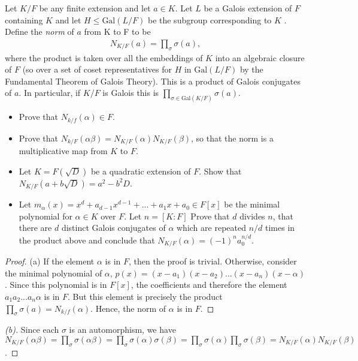 \documentclass[10pt]{article}
\newcommand{\Gal}{\text{Gal}}
\newenvironment{problem}[2][Problem]{\begin{trivlist}
		\item[\hskip \labelsep {\bfseries #1}\hskip \labelsep {\bfseries #2.}]}{\end{trivlist}}
\begin{document}
	\begin{problem}{2.17}
		Let $K/F$ be any finite extension and let $a \in K$. Let $L$ be a Galois extension of $F$ containing $K$ and let $H \leq \Gal(L/F)$ be the subgroup corresponding to $K$ . Define the \textit{norm} of $a$ from K to F to be
		\begin{align*}
			N_{K/F}(a) = \prod_{\sigma} \sigma(a),
		\end{align*}
		where the product is taken over all the embeddings of $K$ into an algebraic closure of $F$ (so over a set of coset representatives for $H$ in $\Gal(L/F)$ by the Fundamental Theorem	of Galois Theory). This is a product of Galois conjugates of $a$. In particular, if $K/F$ is	Galois this is $\prod_{\sigma \in \Gal(K/F)} \sigma(a)$.
		\begin{itemize}
			\item[\textbf{(a)}] Prove that $N_{k/f}(\alpha) \in F$.
			\item[\textbf{(b)}] Prove that $N_{k/F}(\alpha \beta) = N_{K/F}(\alpha)N_{K/F}(\beta)$, so that the norm is a multiplicative map from $K$ to $F$.
			\item[\textbf{(c)}] Let $K = F(\sqrt{D})$ be a quadratic extension of $F$. Show that $N_{K/F}(a+b\sqrt{D}) = a^2 - b^2D$.
			\item[\textbf{(d)}] Let $m_{\alpha}(x) = x^d + a_{d-1}x^{d-1} + ... + a_1x + a_0 \in F[x]$ be the minimal polynomial for $\alpha \in K$ over $F$. Let $n=[K:F]$ Prove that $d$ divides $n$, that there are $d$ distinct Galois conjugates of $\alpha$ which are repeated $n/d$ times in the product above and conclude that $N_{K/F}(\alpha) = (-1)^na_0^{n/d}.$
		\end{itemize}
		\begin{proof}{(a)} If the element $\alpha$ is in $F$, then the proof is trivial. Otherwise, consider the minimal polynomial of $\alpha$, $p(x) = (x-a_1)(x-a_2)...(x-a_n)(x-\alpha)$. Since this polynomial is in $F[x]$, the coefficients and therefore the element $a_1a_2...a_n\alpha$ is in $F$. But this element is precisely the product $\prod_{\sigma} \sigma(a) = N_{k/f}(\alpha)$. Hence, the norm of $\alpha$ is in $F$.
		\end{proof}
		\begin{proof}[(b)]
			Since each $\sigma$ is an automorphism, we have $N_{K/F}(\alpha \beta) = \prod_{\sigma} \sigma(\alpha \beta) = \prod_{\sigma} \sigma(\alpha) \sigma (\beta) = \prod_{\sigma} \sigma(\alpha) \prod_{\sigma} \sigma (\beta) = N_{K/F}(\alpha) N_{K/F}(\beta)$. 
		\end{proof}

\end{problem}
\end{document}

